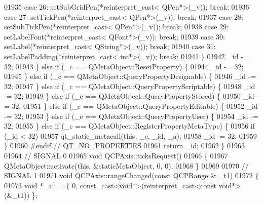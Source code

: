 \begin{DoxyCode}
01935         \textcolor{keywordflow}{case} 26: setSubGridPen(*reinterpret\_cast< QPen*>(\_v)); \textcolor{keywordflow}{break};
01936         \textcolor{keywordflow}{case} 27: setTickPen(*reinterpret\_cast< QPen*>(\_v)); \textcolor{keywordflow}{break};
01937         \textcolor{keywordflow}{case} 28: setSubTickPen(*reinterpret\_cast< QPen*>(\_v)); \textcolor{keywordflow}{break};
01938         \textcolor{keywordflow}{case} 29: setLabelFont(*reinterpret\_cast< QFont*>(\_v)); \textcolor{keywordflow}{break};
01939         \textcolor{keywordflow}{case} 30: setLabel(*reinterpret\_cast< QString*>(\_v)); \textcolor{keywordflow}{break};
01940         \textcolor{keywordflow}{case} 31: setLabelPadding(*reinterpret\_cast< int*>(\_v)); \textcolor{keywordflow}{break};
01941         \}
01942         \_id -= 32;
01943     \} \textcolor{keywordflow}{else} \textcolor{keywordflow}{if} (\_c == QMetaObject::ResetProperty) \{
01944         \_id -= 32;
01945     \} \textcolor{keywordflow}{else} \textcolor{keywordflow}{if} (\_c == QMetaObject::QueryPropertyDesignable) \{
01946         \_id -= 32;
01947     \} \textcolor{keywordflow}{else} \textcolor{keywordflow}{if} (\_c == QMetaObject::QueryPropertyScriptable) \{
01948         \_id -= 32;
01949     \} \textcolor{keywordflow}{else} \textcolor{keywordflow}{if} (\_c == QMetaObject::QueryPropertyStored) \{
01950         \_id -= 32;
01951     \} \textcolor{keywordflow}{else} \textcolor{keywordflow}{if} (\_c == QMetaObject::QueryPropertyEditable) \{
01952         \_id -= 32;
01953     \} \textcolor{keywordflow}{else} \textcolor{keywordflow}{if} (\_c == QMetaObject::QueryPropertyUser) \{
01954         \_id -= 32;
01955     \} \textcolor{keywordflow}{else} \textcolor{keywordflow}{if} (\_c == QMetaObject::RegisterPropertyMetaType) \{
01956         \textcolor{keywordflow}{if} (\_id < 32)
01957             qt\_static\_metacall(\textcolor{keyword}{this}, \_c, \_id, \_a);
01958         \_id -= 32;
01959     \}
01960 \textcolor{preprocessor}{#endif // QT\_NO\_PROPERTIES}
01961     \textcolor{keywordflow}{return} \_id;
01962 \}
01963 
01964 \textcolor{comment}{// SIGNAL 0}
01965 \textcolor{keywordtype}{void} QCPAxis::ticksRequest()
01966 \{
01967     QMetaObject::activate(\textcolor{keyword}{this}, &staticMetaObject, 0, 0);
01968 \}
01969 
01970 \textcolor{comment}{// SIGNAL 1}
01971 \textcolor{keywordtype}{void} QCPAxis::rangeChanged(\textcolor{keyword}{const} QCPRange & \_t1)
01972 \{
01973     \textcolor{keywordtype}{void} *\_a[] = \{ 0, \textcolor{keyword}{const\_cast<}\textcolor{keywordtype}{void}*\textcolor{keyword}{>}(\textcolor{keyword}{reinterpret\_cast<}\textcolor{keyword}{const }\textcolor{keywordtype}{void}*\textcolor{keyword}{>}(&\_t1)) \};

\end{DoxyCode}
